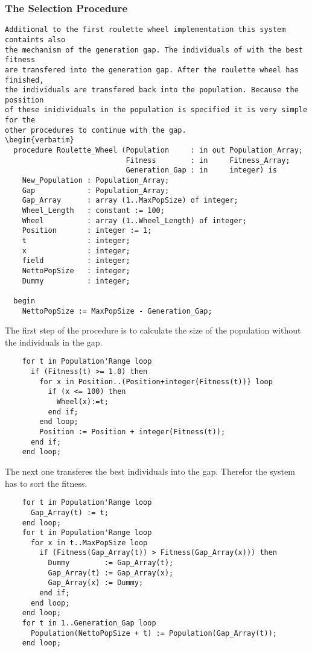 \subsubsection{The Selection Procedure}
\begin{verbatim}
Additional to the first roulette wheel implementation this system containts also
the mechanism of the generation gap. The individuals of with the best fitness
are transfered into the generation gap. After the roulette wheel has finished,
the individuals are transfered back into the population. Because the possition
of these inidividuals in the population is specified it is very simple for the
other procedures to continue with the gap.
\begin{verbatim}
  procedure Roulette_Wheel (Population     : in out Population_Array;
                            Fitness        : in     Fitness_Array;
                            Generation_Gap : in     integer) is
    New_Population : Population_Array;
    Gap            : Population_Array;
    Gap_Array      : array (1..MaxPopSize) of integer;
    Wheel_Length   : constant := 100;
    Wheel          : array (1..Wheel_Length) of integer;
    Position       : integer := 1;
    t              : integer;
    x              : integer;
    field          : integer;
    NettoPopSize   : integer;
    Dummy          : integer;

  begin
    NettoPopSize := MaxPopSize - Generation_Gap;
\end{verbatim}
The first step of the procedure is to calculate the size of the population
without the individuals in the gap.
\begin{verbatim}
    for t in Population'Range loop
      if (Fitness(t) >= 1.0) then
        for x in Position..(Position+integer(Fitness(t))) loop
          if (x <= 100) then
            Wheel(x):=t;
          end if;
        end loop;
        Position := Position + integer(Fitness(t));
      end if;
    end loop;
\end{verbatim}
The next one transferes the best individuals into the gap. Therefor the system
has to sort the fitness.
\begin{verbatim}
    for t in Population'Range loop
      Gap_Array(t) := t;
    end loop;
    for t in Population'Range loop
      for x in t..MaxPopSize loop
        if (Fitness(Gap_Array(t)) > Fitness(Gap_Array(x))) then
          Dummy        := Gap_Array(t);
          Gap_Array(t) := Gap_Array(x);
          Gap_Array(x) := Dummy;
        end if;
      end loop;
    end loop;
    for t in 1..Generation_Gap loop
      Population(NettoPopSize + t) := Population(Gap_Array(t));
    end loop;
\end{verbatim}
